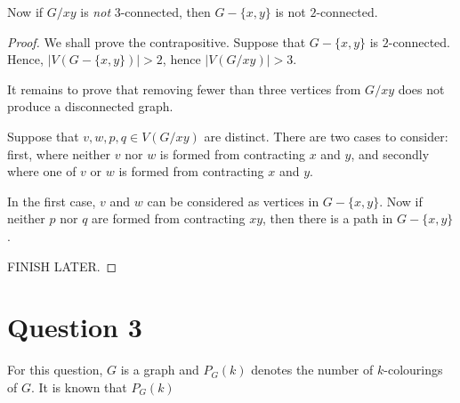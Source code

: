 \documentclass{unswmaths}
\begin{document}
\begin{proposition}[Part (b)]
    Now if $G/xy$ is \emph{not} $3$-connected, then $G-\{x,y\}$ is not
    $2$-connected.
\end{proposition}
\begin{proof}
%    
%    

    We shall prove the contrapositive. Suppose that $G-\{x,y\}$
    is $2$-connected. Hence, $|V(G-\{x,y\})| > 2$, hence $|V(G/xy)| > 3$. 
    
    It remains to prove that removing fewer than three vertices
    from $G/xy$ does not produce a disconnected graph.
    
    Suppose that $v,w,p,q \in V(G/xy)$ are distinct. 
    There are two cases to consider: first, where neither $v$ nor $w$
    is formed from contracting $x$ and $y$, and secondly where one of $v$ or $w$
    is formed from contracting $x$ and $y$.
    
    In the first case, $v$ and $w$ can be considered as vertices in $G-\{x,y\}$.
    Now if neither $p$ nor $q$ are formed from contracting $xy$, then there
    is a path in $G-\{x,y\}$. 
    
    FINISH LATER.
    
\end{proof}

\section{Question 3}
For this question, $G$ is a graph and $P_G(k)$ denotes
the number of $k$-colourings of $G$. It is known that $P_G(k)$
\end{document}
